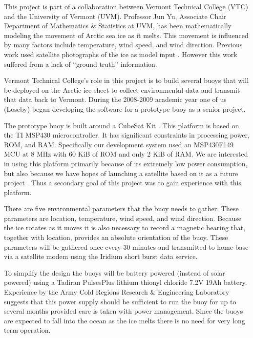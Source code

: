 \documentclass{sig-alternate}
\begin{document}
This project is part of a collaboration between Vermont Technical College (VTC) and the
University of Vermont (UVM). Professor Jun Yu, Associate Chair Department of Mathematics \&
Statistics at UVM, has been mathematically modeling the movement of Arctic sea ice as it melts.
This movement is influenced by many factors include temperature, wind speed, and wind direction.
Previous work used satellite photographs of the ice as model input \cite{yu:2005}. However this
work suffered from a lack of ``ground truth'' information.

Vermont Technical College's role in this project is to build several buoys that will be deployed
on the Arctic ice sheet to collect environmental data and transmit that data back to Vermont.
During the 2008-2009 academic year one of us (Loseby) began developing the software for a
prototype buoy as a senior project.

The prototype buoy is built around a CubeSat Kit \cite{www:cubesatkit}. This platform is based
on the TI MSP430 microcontroller. It has significant constraints in processing power, ROM, and
RAM. Specifically our development system used an MSP\-430F149 MCU at 8 MHz with 60 KiB of ROM
and only 2 KiB of RAM. We are interested in using this platform primarily because of its
extremely low power consumption, but also because we have hopes of launching a satellite based
on it as a future project \cite{brandon:2008}. Thus a secondary goal of this project was to gain
experience with this platform.

There are five environmental parameters that the buoy needs to gather. These parameters are
location, temperature, wind speed, and wind direction. Because the ice rotates as it moves it is
also necessary to record a magnetic bearing that, together with location, provides an absolute
orientation of the buoy. These parameters will be gathered once every 30 minutes and transmitted
to home base via a satellite modem using the Iridium short burst data service.

To simplify the design the buoys will be battery powered (instead of solar powered) using a
Tadiran PulsesPlus lithium thionyl chloride 7.2V 19Ah battery. Experience by the Army Cold
Regions Research \& Engineering Laboratory \cite{www:crrel} suggests that this power supply
should be sufficient to run the buoy for up to several months provided care is taken with power
management. Since the buoys are expected to fall into the ocean as the ice melts there is no
need for very long term operation.
\end{document}
